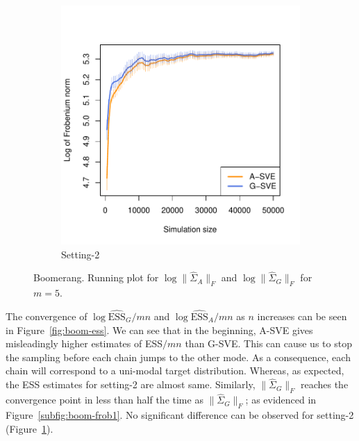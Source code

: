 \documentclass[11pt]{article}
\theoremstyle{remark}
\begin{document}
\begin{figure}[h]
\begin{subfigure}[h]{.4\textwidth}
      \includegraphics[width = \textwidth]{plots/boom-frob_1_10_7_m5.pdf}
      \caption{Setting-2}
      \label{subfig:boom-frob2}
    \end{subfigure}
    \caption{Boomerang. Running plot for $\log \|\hat{\Sigma}_A\|_F$ and $\log \|\hat{\Sigma}_G\|_F$ for $m = 5$.}
    \label{fig:boom-frob}
\end{figure}

The convergence of $\log \widehat{\textrm{ESS}}_G/mn$ and $\log \widehat{\textrm{ESS}}_A/mn$ as $n$ increases can be seen in Figure~\ref{fig:boom-ess}. We can see that in the beginning, A-SVE gives misleadingly higher estimates of ESS$/mn$ than G-SVE. This can cause us to stop the sampling before each chain jumps to the other mode. As a consequence, each chain will correspond to a uni-modal target distribution. Whereas, as expected, the ESS estimates for setting-2 are almost same. Similarly, $\|\hat{\Sigma}_G\|_F$ reaches the convergence point in less than half the time as $\|\hat{\Sigma}_G\|_F$; as evidenced in Figure~\ref{subfig:boom-frob1}. No significant difference can be observed for setting-2 (Figure~\ref{subfig:boom-frob2}).
\end{document}
